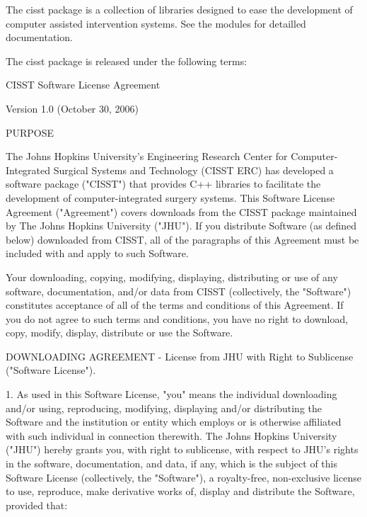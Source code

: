 The cisst package is a collection of libraries designed to ease the development of computer assisted intervention systems. See the modules for detailled documentation.

The cisst package is released under the following terms\+: 
\begin{DoxyPre}
CISST Software License Agreement\end{DoxyPre}



\begin{DoxyPre}Version 1.0 (October 30, 2006)\end{DoxyPre}



\begin{DoxyPre}PURPOSE\end{DoxyPre}



\begin{DoxyPre}The Johns Hopkins University's Engineering Research Center for
Computer-Integrated Surgical Systems and Technology (CISST ERC) has
developed a software package ("CISST") that provides C++ libraries to
facilitate the development of computer-integrated surgery systems.
This Software License Agreement ("Agreement") covers downloads from
the CISST package maintained by The Johns Hopkins University ("JHU").
If you distribute Software (as defined below) downloaded from CISST,
all of the paragraphs of this Agreement must be included with and
apply to such Software.\end{DoxyPre}



\begin{DoxyPre}Your downloading, copying, modifying, displaying, distributing or use
of any software, documentation, and/or data from CISST (collectively,
the "Software") constitutes acceptance of all of the terms and
conditions of this Agreement. If you do not agree to such terms and
conditions, you have no right to download, copy, modify, display,
distribute or use the Software.\end{DoxyPre}



\begin{DoxyPre}DOWNLOADING AGREEMENT - License from JHU with Right to Sublicense
("Software License").\end{DoxyPre}



\begin{DoxyPre}1. As used in this Software License, "you" means the individual
   downloading and/or using, reproducing, modifying, displaying and/or
   distributing the Software and the institution or entity which
   employs or is otherwise affiliated with such individual in
   connection therewith. The Johns Hopkins University ("JHU") hereby
   grants you, with right to sublicense, with respect to JHU's rights
   in the software, documentation, and data, if any, which is the
   subject of this Software License (collectively, the "Software"), a
   royalty-free, non-exclusive license to use, reproduce, make
   derivative works of, display and distribute the Software, provided
   that:\end{DoxyPre}



